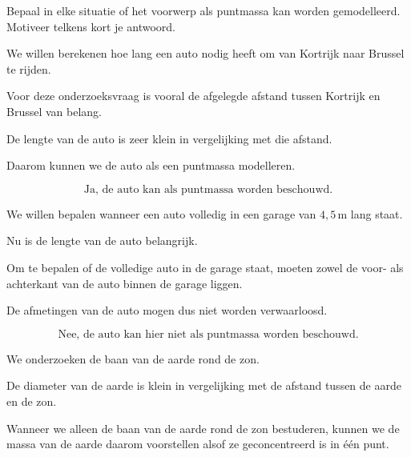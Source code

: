 \documentclass{ximera}
\begin{document}

\begin{oefening}{\oefB\ESS}

  Bepaal in elke situatie of het voorwerp als puntmassa kan worden gemodelleerd.
  Motiveer telkens kort je antwoord.
  
  \begin{question}
  We willen berekenen hoe lang een auto nodig heeft om van Kortrijk naar Brussel
  te rijden.
  
  \begin{oplossing}
  Voor deze onderzoeksvraag is vooral de afgelegde afstand tussen Kortrijk en
  Brussel van belang.
  
  De lengte van de auto is zeer klein in vergelijking met die afstand.
  
  Daarom kunnen we de auto als een puntmassa modelleren.
  
  \[
  \boxed{\text{Ja, de auto kan als puntmassa worden beschouwd.}}
  \]
  \end{oplossing}
  \end{question}
  
  
  \begin{question}
  We willen bepalen wanneer een auto volledig in een garage van
  $4{,}5\,\si{\meter}$ lang staat.
  
  \begin{oplossing}
  Nu is de lengte van de auto belangrijk.
  
  Om te bepalen of de volledige auto in de garage staat, moeten zowel de
  voor- als achterkant van de auto binnen de garage liggen.
  
  De afmetingen van de auto mogen dus niet worden verwaarloosd.
  
  \[
  \boxed{\text{Nee, de auto kan hier niet als puntmassa worden beschouwd.}}
  \]
  \end{oplossing}
  \end{question}
  
  
  \begin{question}
  We onderzoeken de baan van de aarde rond de zon.
  
  \begin{oplossing}
  De diameter van de aarde is klein in vergelijking met de afstand tussen de
  aarde en de zon.
  
  Wanneer we alleen de baan van de aarde rond de zon bestuderen, kunnen we de
  massa van de aarde daarom voorstellen alsof ze geconcentreerd is in één punt.
  

\end{oplossing}
\end{question}
\end{oefening}
\end{document}
